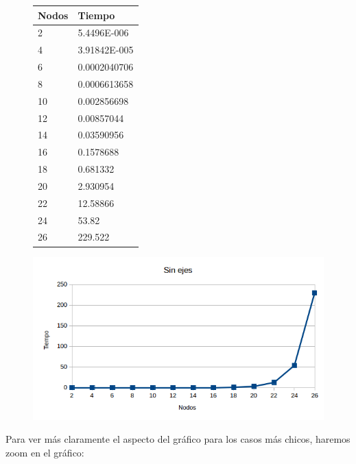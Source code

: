    \begin{figure}[h!]
   \begin{center}
 	\begin{tabular}{| l | l |}
 \hline
Nodos & Tiempo \\ \hline
2 & 5.4496E-006 \\ \hline
4 & 3.91842E-005 \\ \hline
6 & 0.0002040706 \\ \hline
8 & 0.0006613658 \\ \hline
10 &  0.002856698 \\ \hline
12 &  0.00857044 \\ \hline
14 &  0.03590956 \\ \hline
16 &  0.1578688 \\ \hline
18 &  0.681332 \\ \hline
20 &  2.930954 \\ \hline
22 &  12.58866 \\ \hline
24 &  53.82 \\ \hline
26 &  229.522 \\ \hline
\end{tabular}
\end{center}
 \end{figure}
 

   \begin{figure}[h!]
   \begin{center}
 	\includegraphics[scale=0.7]{imagenes/exacto/Vacios.png}
   \end{center}
 \end{figure}
 
\newpage 
 
Para ver m\'as claramente el aspecto del gr\'afico para los casos m\'as chicos, haremos zoom en el gr\'afico:\\

